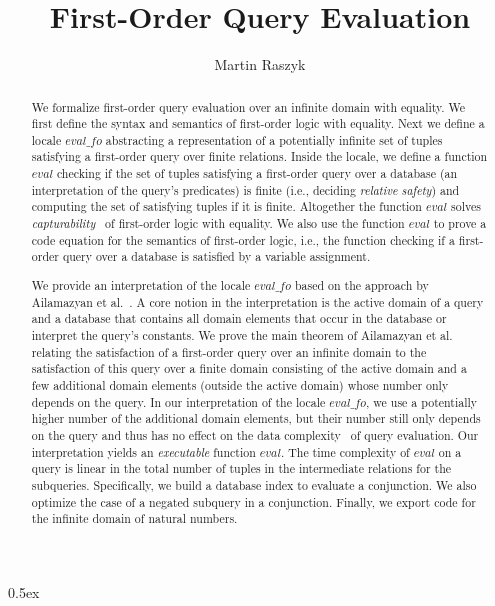 \documentclass[10pt,a4paper]{article}
\begin{document}
\title{First-Order Query Evaluation}
\author{Martin Raszyk}

\maketitle

\begin{abstract}
We formalize first-order query evaluation over an infinite domain with equality.
We first define the syntax and semantics of first-order logic with equality.
Next we define a locale $\mathit{eval\_fo}$ abstracting a representation of a
potentially infinite set of tuples satisfying a first-order query over finite
relations. Inside the locale, we define a function $\mathit{eval}$ checking if
the set of tuples satisfying a first-order query over a database (an
interpretation of the query's predicates) is finite (i.e., deciding
\emph{relative safety}) and computing the set of satisfying tuples if it is
finite. Altogether the function $\mathit{eval}$ solves
\emph{capturability}~\cite{DBLP:conf/lics/AvronH91} of first-order logic with
equality. We also use the function $\mathit{eval}$ to prove a code equation for
the semantics of first-order logic, i.e., the function checking if a first-order
query over a database is satisfied by a variable assignment.

We provide an interpretation of the locale $\mathit{eval\_fo}$ based on the
approach by Ailamazyan et al.~\cite{AGSS86}. A core notion in the interpretation
is the active domain of a query and a database that contains all domain elements
that occur in the database or interpret the query's constants. We prove the main
theorem of Ailamazyan et al.~\cite{AGSS86} relating the satisfaction of a
first-order query over an infinite domain to the satisfaction of this query over
a finite domain consisting of the active domain and a few additional domain
elements (outside the active domain) whose number only depends on the query. In
our interpretation of the locale $\mathit{eval\_fo}$, we use a potentially
higher number of the additional domain elements, but their number still only
depends on the query and thus has no effect on the data
complexity~\cite{DBLP:conf/stoc/Vardi82} of query evaluation. Our interpretation
yields an \emph{executable} function $\mathit{eval}$. The time complexity of
$\mathit{eval}$ on a query is linear in the total number of tuples in the
intermediate relations for the subqueries. Specifically, we build a database
index to evaluate a conjunction. We also optimize the case of a negated subquery
in a conjunction. Finally, we export code for the infinite domain of natural
numbers.
\end{abstract}

\tableofcontents

\parindent 0pt\parskip 0.5ex





\end{document}
